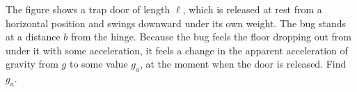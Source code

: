 The figure shows a trap door of length $\ell$, which is released at rest
from a horizontal position and swings downward under its own weight.
The bug stands at a distance $b$ from the hinge. Because the bug feels
the floor dropping out from under it with some acceleration, it feels
a change in the apparent acceleration of gravity from $g$ to some value
$g_a$, at the moment when the door is released. Find $g_a$.\answercheck
